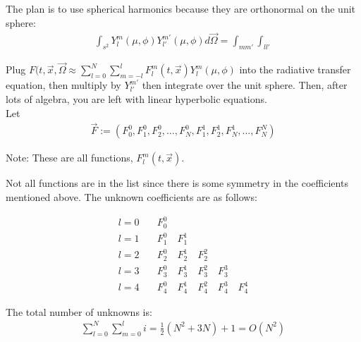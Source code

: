 The plan is to use spherical harmonics because they are orthonormal on the unit sphere:
\begin{align*}
\int_{s^2} Y^m _l (\mu, \phi) Y^{m'} _{l'} (\mu, \phi) d\vec{\Omega} = \int_{m m'} \int_{l l'}
\end{align*}

Plug $F(t, \vec{x}, \vec{\Omega} \approx \sum^{N}_{l=0} \sum^{l}_{m=-l} F^m _l (t, \vec{x}) Y^m _l (\mu, \phi)$ into the radiative transfer equation, then multiply by $Y^{m'} _{l'}$ then integrate over the unit sphere. Then, after lots of algebra, you are left with linear hyperbolic equations. \\

Let 
\begin{align*}
\vec{F} := (F^0 _0, F^0 _1, F^0 _2, \dots , F^0 _N, F^1 _1, F^1 _2, F^1 _N, \dots , F^N _N)
\end{align*}

Note: These are all functions, $F^m _l (t, \vec{x})$.

Not all functions are in the list since there is some symmetry in the coefficients mentioned above. The unknown coefficients are as follows:

\begin{align*}
l = 0 \quad & F^0 _0 \\
l = 1 \quad & F^0 _1 \quad F^1 _1 \\
l = 2 \quad & F^0 _2 \quad F^1 _2 \quad F^2 _2 \\
l = 3 \quad & F^0 _3 \quad F^1 _3 \quad F^2 _3 \quad F^3 _3 \\
l = 4 \quad & F^0 _4 \quad F^1 _4 \quad F^2 _4 \quad F^3 _4 \quad F^4 _4
\end{align*}

The total number of unknowns is:
\begin{align*}
\sum^N _{l=0} \sum^l _{m=0} i = \frac{1}{2} (N^2 + 3N) + 1 = O(N^2)
\end{align*}